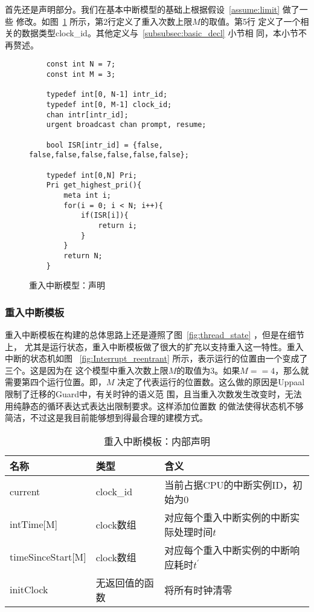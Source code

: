 首先还是声明部分。我们在基本中断模型的基础上根据假设~\ref{assume:limit} 做了一些
修改。如图~\ref{fig:reentrant_decl} 所示，第2行定义了重入次数上限$M$的取值。第5行
定义了一个相关的数据类型clock\_id。其他定义与~\ref{subsubsec:basic_decl} 小节相
同，本小节不再赘述。

\begin{figure}[H]
	\centering
	\begin{lstlisting}
	const int N = 7;
	const int M = 3;
	
	typedef int[0, N-1] intr_id; 
	typedef int[0, M-1] clock_id;
	chan intr[intr_id];
	urgent broadcast chan prompt, resume;
	
	bool ISR[intr_id] = {false, false,false,false,false,false,false};
	
	typedef int[0,N] Pri;
	Pri get_highest_pri(){
		meta int i;
		for(i = 0; i < N; i++){
			if(ISR[i]){
				return i;
			} 
		}
		return N;
	}
	\end{lstlisting}
	\caption{重入中断模型：声明}
	\label{fig:reentrant_decl}
\end{figure}

\subsubsection{重入中断模板}
\label{subsubsec:reentrant_intr}
重入中断模板在构建的总体思路上还是遵照了图~\ref{fig:thread_state} ，但是在细节上，
尤其是运行状态，重入中断模板做了很大的扩充以支持重入这一特性。重入中断的状态机如图
~\ref{fig:Interrupt_reentrant} 所示，表示运行的位置由一个变成了三个。这是因为在
这个模型中重入次数上限$M$的取值为3。如果$M==4$，那么就需要第四个运行位置。即，$M$
决定了代表运行的位置数。这么做的原因是Uppaal限制了迁移的Guard中，有关时钟的语义范
围，且当重入次数发生改变时，无法用纯静态的循环表达式表达出限制要求。这样添加位置数
的做法使得状态机不够简洁，不过这是我目前能够想到得最合理的建模方式。

\begin{table}[htb]
	\centering
	\caption{重入中断模板：内部声明}
	\label{tab:reentrant_intr_decl}
	\begin{tabularx}{\linewidth}{p{7em}p{5em}X}
		\toprule[1.5pt]
		{\heiti 名称} & {\heiti 类型} & {\heiti 含义}\\
		\midrule[1pt]
		current & clock\_id & 当前占据CPU的中断实例ID，初始为0 \\
		\midrule[0.5pt]
		intTime[M] & clock数组 & 对应每个重入中断实例的中断实际处理时间$t$ \\
		\midrule[0.5pt]
		timeSinceStart[M] & clock数组 & 对应每个重入中断实例的中断响应耗时$t^\prime$ \\
		\midrule[0.5pt]
		initClock & 无返回值的函数 & 将所有时钟清零 \\
		\bottomrule[1.5pt]
	\end{tabularx}
\end{table}

